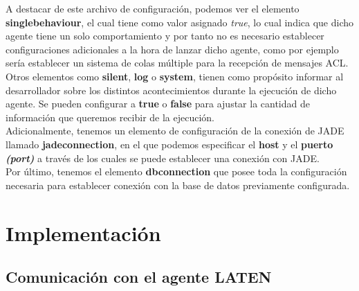 A destacar de este archivo de configuración, podemos ver el elemento \textbf{singlebehaviour}, el cual tiene como valor asignado \textit{true}, lo cual indica que dicho agente tiene un solo comportamiento y por tanto no es necesario establecer configuraciones adicionales a la hora de lanzar dicho agente, como por ejemplo sería establecer un sistema de colas múltiple para la recepción de mensajes ACL.\\

Otros elementos como \textbf{silent}, \textbf{log} o \textbf{system}, tienen como propósito informar al desarrollador sobre los distintos acontecimientos durante la ejecución de dicho agente. Se pueden configurar a \textbf{true} o \textbf{false} para ajustar la cantidad de información que queremos recibir de la ejecución.\\

Adicionalmente, tenemos un elemento de configuración de la conexión de JADE llamado \textbf{jadeconnection}, en el que podemos especificar el \textbf{host} y el \textbf{puerto \textit{(port)}} a través de los cuales se puede establecer una conexión con JADE.\\

Por último, tenemos el elemento \textbf{dbconnection} que posee toda la configuración necesaria para establecer conexión con la base de datos previamente configurada.

\section{Implementación}

\subsection{Comunicación con el agente LATEN}